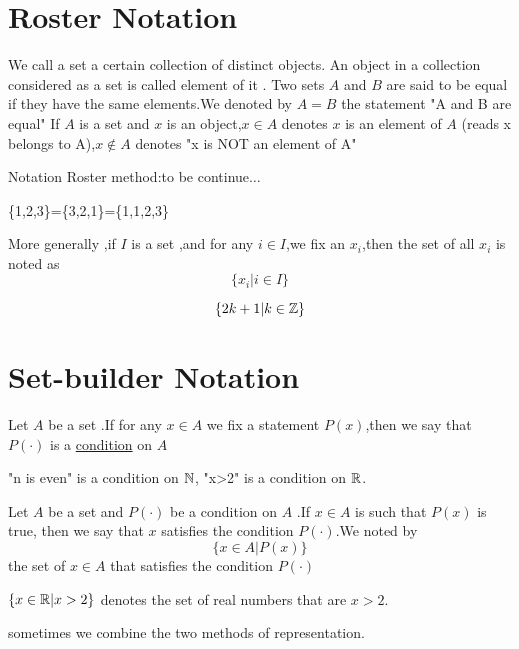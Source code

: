 \documentclass{book}
\numberwithin{equation}{section}
\begin{document}
\section{Roster Notation}
\begin{definitionenv}
    We call a set a certain collection of distinct objects.
    \newline
    An object in a collection considered as a set is called element of it .
    \newline
    Two sets $A$ and $B$ are said to be equal if they have the same elements.We denoted by $A=B$ the statement "A and B are equal"
    \newline
    If $A$ is a set and $x$ is an object,$x \in A$ denotes $x$ is an element of $A$ (reads x belongs to A),$x \notin A$ denotes "x is NOT an element of A" 
\end{definitionenv}
Notation Roster method:to be continue$\dots$
\begin{exampleenv}
    \{1,2,3\}=\{3,2,1\}=\{1,1,2,3\}
\end{exampleenv}
More generally ,if $I$ is a set ,and for any $i \in I$,we fix an $x_i$,then the set of all $x_i$ is noted as $$\{x_i|i\in I\}$$
\begin{exampleenv}
    $$\{2k+1|k\in \mathbb{Z}\}$$
\end{exampleenv}
\section{Set-builder Notation}
\begin{definitionenv}
    Let $A$ be a set .If for any $x\in A $ we fix a statement $P(x)$,then we say that $P(\cdot)$ is a \underline{condition} on $A$ 
\end{definitionenv}
\begin{exampleenv}
    "n is even" is a condition on $\mathbb{N}$, "x>2" is a condition on $\mathbb{R}$.
\end{exampleenv}
\begin{definitionenv}
    Let $A$ be a set and $P(\cdot)$ be a condition on $A$ .If $x\in A$ is such that $P(x)$ is true, then we say that $x$ satisfies the condition $P(\cdot)$.We noted by $$\{x \in A|P(x)\}$$the set of $x\in A$ that satisfies the condition $P(\cdot)$
\end{definitionenv}
\begin{exampleenv}
    $\{x\in \mathbb{R}|x>2\}$ denotes the set of real numbers that are $x>2$.
\end{exampleenv}
sometimes we combine the two methods of representation.
\end{document}

